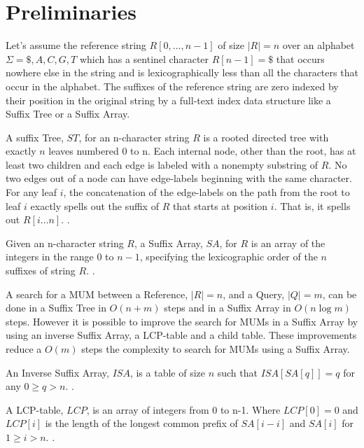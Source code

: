 \documentclass[runningheads,a4paper]{llncs}
\begin{document}
\section{Preliminaries}
Let's assume the reference string $R[0,\ldots, n-1]$ of size $|R|=n$ over an alphabet $\Sigma={ \$, A, C, G, T}$ which has a sentinel character $R[n-1] = \$$ that occurs nowhere else in the string and is lexicographically less than all the characters that occur in the alphabet. The suffixes of the reference string are zero indexed by their position in the original string by a full-text index data structure like a Suffix Tree or a Suffix Array. 
\begin{definition}
A suffix Tree, $ST$, for an n-character string $R$ is a rooted directed tree with exactly $n$ leaves numbered 0 to n. Each internal node, other than the root, has at least two children and each edge is labeled with a nonempty substring of $R$. No two edges out of a node can have edge-labels beginning with the same character. For any leaf $i$, the concatenation of the edge-labels on the path from the root to leaf $i$ exactly spells out the suffix of $R$ that starts at position $i$. That is, it spells out $R[i\ldots n]$. \cite{Gusfield1997}.
\end{definition}
\begin{definition}
Given an n-character string $R$, a Suffix Array, $SA$, for $R$ is an array of the integers in the range 0 to $n-1$, specifying the lexicographic order of the $n$ suffixes of string $R$. \cite{Gusfield1997}.
\end{definition}
A search for a MUM between a Reference, $|R|=n$, and a Query, $|Q|=m$,  can be done in a Suffix Tree in $O(n+m)$ steps and in a Suffix Array in $O(n\log m)$ steps. However it is possible to improve the search for MUMs in a Suffix Array by using an inverse Suffix Array, a LCP-table and a child table. These improvements reduce a $O(m)$ steps \cite{Abouelhoda2004} the complexity to search for MUMs using a Suffix Array.
\begin{definition}
An Inverse Suffix Array, $ISA$, is a table of size $n$ such that $ISA[SA[q]]=q$ for any $0\geq q> n$. \cite{Abouelhoda2004}.
\end{definition}
\begin{definition}
A LCP-table, $LCP$, is an array of integers from 0 to n-1. Where $LCP[0]=0$ and $LCP[i]$ is the length of the longest common prefix of $SA[i-i]$ and $SA[i]$ for $1\geq i>n$. \cite{Abouelhoda2004}.
\end{definition}
\end{document}
